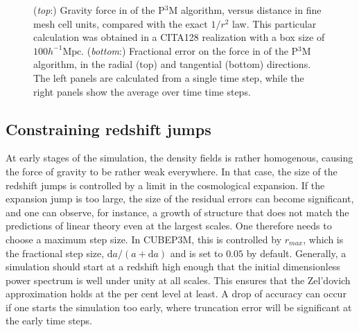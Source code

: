 \begin{figure}
\begin{center}
  \caption{({\it top}:) Gravity force in of the P$^3$M algorithm, versus distance in fine mesh cell units, compared with the exact $1/r^{2}$ law.
    This particular calculation was obtained in a CITA128 realization with  a box size of $100 h^{-1}\mbox{Mpc}$.
    ({\it bottom}:) Fractional error on the force in of the P$^3$M algorithm, in the radial (top) and tangential (bottom) directions.
    The left panels are calculated from a single time step, while the right panels show the average over time time steps.
    \label{fig:den_force_N10}}
\end{center}
\end{figure}


\subsection{Constraining redshift jumps}

At early stages of the simulation, the density fields is rather homogenous, causing the force of gravity to be
rather weak everywhere. In that case, the size of the redshift jumps is controlled by a limit in the cosmological expansion.
If the expansion jump is too large, the size of the residual errors can become significant, and one can observe, for instance,
a growth of structure that does not match the predictions of  linear theory even at the largest scales.
One therefore needs to choose a maximum step size. In {\small CUBEP3M}, this is controlled by $r_{max}$, which is the fractional step size,
$\mbox{d}a/(a + \mbox{d}a)$ and is set to $0.05$ by default.  Generally, a simulation should start at a redshift high enough that
the initial dimensionless power spectrum is well under unity at all scales. This ensures that the Zel'dovich approximation
 holds at the per cent level at least. A drop of accuracy can occur if one starts the simulation too early, where
 truncation error will be significant at the early time steps.


